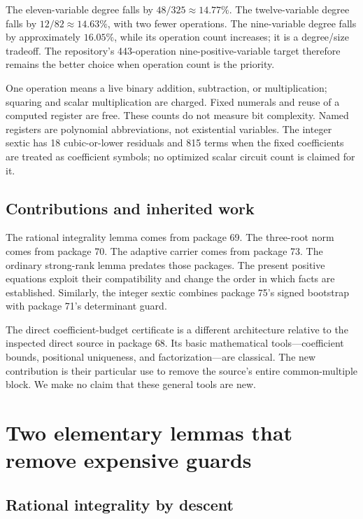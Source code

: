 \documentclass[11pt]{article}
\theoremstyle{definition}
\theoremstyle{remark}
\begin{document}
The eleven-variable degree falls by $48/325\approx14.77\%$. The
twelve-variable degree falls by $12/82\approx14.63\%$, with two fewer
operations. The nine-variable degree falls by approximately $16.05\%$,
while its operation count increases; it is a degree/size tradeoff. The
repository's 443-operation nine-positive-variable target therefore remains
the better choice when operation count is the priority.

One operation means a live binary addition, subtraction, or multiplication;
squaring and scalar multiplication are charged. Fixed numerals and reuse of
a computed register are free. These counts do not measure bit complexity.
Named registers are polynomial abbreviations, not existential variables.
The integer sextic has 18 cubic-or-lower residuals and 815 terms when the
fixed coefficients are treated as coefficient symbols; no optimized scalar
circuit count is claimed for it.

\subsection{Contributions and inherited work}

The rational integrality lemma comes from package 69. The three-root norm
comes from package 70. The adaptive carrier comes from package 73. The
ordinary strong-rank lemma predates those packages. The present positive
equations exploit their compatibility and change the order in which facts
are established. Similarly, the integer sextic combines package 75's signed
bootstrap with package 71's determinant guard.

The direct coefficient-budget certificate is a different architecture
relative to the inspected direct source in package 68. Its basic mathematical
tools---coefficient bounds, positional uniqueness, and factorization---are
classical. The new contribution is their particular use to remove the source's
entire common-multiple block. We make no claim that these general tools are new.

\section{Two elementary lemmas that remove expensive guards}\label{sec:lemmas}

\subsection{Rational integrality by descent}
\end{document}
